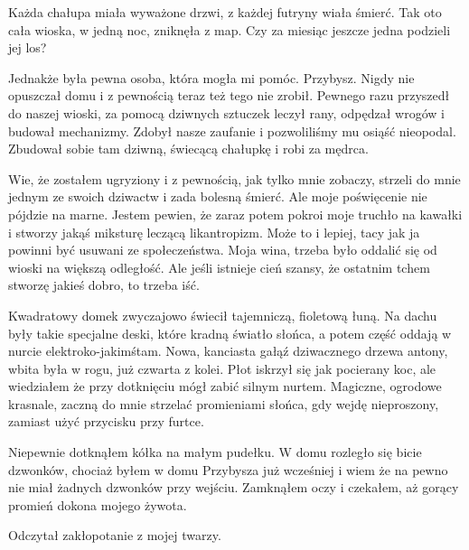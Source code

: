 Każda chałupa miała wyważone drzwi, z każdej futryny wiała śmierć.
Tak oto cała wioska, w jedną noc, zniknęła z map.
Czy za miesiąc jeszcze jedna podzieli jej los? 

Jednakże była pewna osoba, która mogła mi pomóc.
Przybysz. Nigdy nie opuszczał domu i z pewnością teraz też tego nie zrobił.
Pewnego razu przyszedł do naszej wioski, za pomocą dziwnych sztuczek leczył rany, odpędzał wrogów i budował mechanizmy.
Zdobył nasze zaufanie i pozwoliliśmy mu osiąść nieopodal. Zbudował sobie tam dziwną, świecącą chałupkę i robi za mędrca.

Wie, że zostałem ugryziony i z pewnością, jak tylko mnie zobaczy, strzeli do mnie jednym ze swoich dziwactw i zada bolesną śmierć.
Ale moje poświęcenie nie pójdzie na marne. Jestem pewien, że zaraz potem pokroi moje truchło na kawałki i stworzy jakąś miksturę leczącą likantropizm.
Może to i lepiej, tacy jak ja powinni być usuwani ze społeczeństwa. Moja wina, trzeba było oddalić się od wioski na większą odległość.
Ale jeśli istnieje cień szansy, że ostatnim tchem stworzę jakieś dobro, to trzeba iść.

\divider{}

Kwadratowy domek zwyczajowo świecił tajemniczą, fioletową łuną.
Na dachu były takie specjalne deski, które kradną światło słońca, a potem część oddają w nurcie elektroko-jakimśtam.
Nowa, kanciasta gałąź dziwacznego drzewa antony, wbita była w rogu, już czwarta z kolei.
Płot iskrzył się jak pocierany koc, ale wiedziałem że przy dotknięciu mógł zabić silnym nurtem.
Magiczne, ogrodowe krasnale, zaczną do mnie strzelać promieniami słońca, gdy wejdę nieproszony, zamiast użyć przycisku przy furtce.

Niepewnie dotknąłem kółka na małym pudełku. 
W domu rozległo się bicie dzwonków, chociaż byłem w domu Przybysza już wcześniej i wiem że na pewno nie miał żadnych dzwonków przy wejściu.
Zamknąłem oczy i czekałem, aż gorący promień dokona mojego żywota.

Odczytał zakłopotanie z mojej twarzy.

